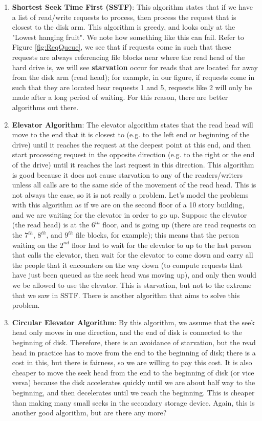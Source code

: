 \documentclass[a4paper]{article}
\begin{document}
\begin{enumerate}
\begin{enumerate}
\item \textbf{Shortest Seek Time First (SSTF)}: This algorithm states that if we have a list of read/write requests to process, then process the request that is closest to the disk arm. 
This algorithm is greedy, and looks only at the "Lowest hanging fruit". We note how something like this can fail. Refer to Figure \ref{fig:ReqQueue}, we see that if requests come in such that these requests are always referencing file blocks near where the read head of the hard drive is, we will see \textbf{starvation} occur for reads that are located far away from the disk arm (read head); for example, in our figure, if requests come in such that they are located hear requests 1 and 5, requests like 2 will only be made after a long period of waiting. 
For this reason, there are better algorithms out there. 
\item \textbf{Elevator Algorithm}: The elevator algorithm states that the read head will move to the end that it is closest to (e.g. to the left end or beginning of the drive) until it reaches the request at the deepest point at this end, and then start processing request in the opposite direction (e.g. to the right or the end of the drive) until it reaches the last request in this direction. This algorithm is good because it does not cause starvation to any of the readers/writers unless all calls are to the same side of the movement of the read head. This is not always the case, so it is not really a problem. Let's model the problems with this algorithm as if we are on the second floor of a 10 story building, and we are waiting for the elevator in order to go up. Suppose the elevator (the read head) is at the $6^{th}$ floor, and is going up (there are read requests on the $7^{th}$, $8^{th}$, and $9^{th}$ file blocks, for example); this means that the person waiting on the $2^{nd}$ floor had to wait for the elevator to up to the last person that calls the elevator, then wait for the elevator to come down and carry all the people that it encounters on the way down (to compute requests that have just been queued as the seek head was moving up), and only then would we be allowed to use the elevator. This is starvation, but not to the extreme that we saw in  SSTF. There is another algorithm that aims to solve this problem.
\item \textbf{Circular Elevator Algorithm}: By this algorithm, we assume that the seek head only moves in one direction, and the end of disk is connected to the beginning of disk. Therefore, there is an avoidance of starvation, but the read head in practice has to move from the end to the beginning of disk; there is a cost in this, but there is fairness, so we are willing to pay this cost. It is also cheaper to move the seek head from the end to the beginning of disk (or vice versa) because the disk accelerates quickly until we are about half way to the beginning, and then decelerates until we reach the beginning. This is cheaper than making many small seeks in the secondary storage device. Again, this is another good algorithm, but are there any more?

\end{enumerate}
\end{enumerate}
\end{document}
